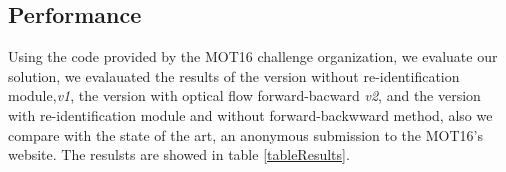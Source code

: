 \documentclass[12pt, a4paper, titlepage,twoside,openright]{article}
\begin{document}
\subsection{Performance}

Using the code provided by the MOT16 challenge organization, we evaluate our solution, we evalauated the results of the version without re-identification module,\textit{v1}, the version with optical flow forward-bacward \textit{v2}, and the version with re-identification module and without forward-backwward method, also we compare with the state of the art, an anonymous submission to the MOT16's website. The resulsts are showed in table \ref{tableResults}.


%
\end{document}
